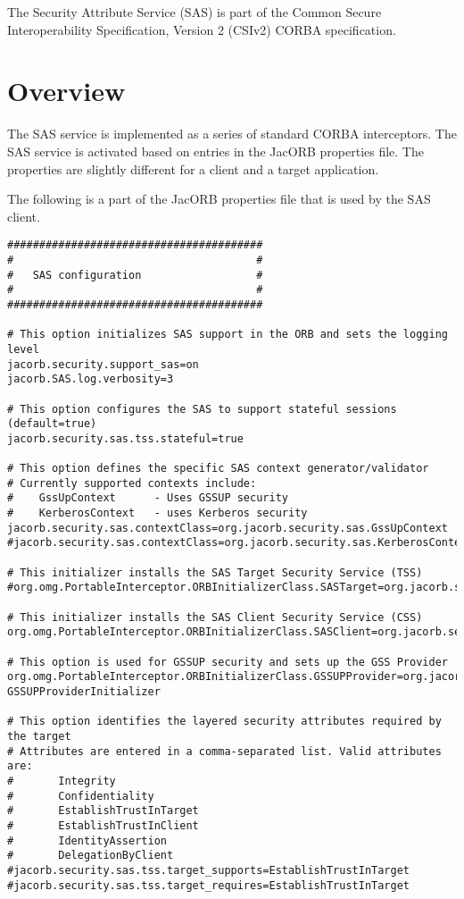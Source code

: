 
The Security Attribute Service (SAS) is part of the Common Secure 
Interoperability Specification, Version 2 (CSIv2) CORBA specification.

\section{Overview}

The SAS service is implemented as a series of standard CORBA interceptors.
The SAS service is activated based on entries in the JacORB properties file.
The properties are slightly different for a client and a target application.

The following is a part of the JacORB properties file that is used by 
the SAS client.

\begin{scriptsize}
\begin{verbatim}
########################################
#                                      #
#   SAS configuration                  #
#                                      #
########################################

# This option initializes SAS support in the ORB and sets the logging level
jacorb.security.support_sas=on
jacorb.SAS.log.verbosity=3

# This option configures the SAS to support stateful sessions (default=true)
jacorb.security.sas.tss.stateful=true

# This option defines the specific SAS context generator/validator
# Currently supported contexts include:
#    GssUpContext      - Uses GSSUP security
#    KerberosContext   - uses Kerberos security
jacorb.security.sas.contextClass=org.jacorb.security.sas.GssUpContext
#jacorb.security.sas.contextClass=org.jacorb.security.sas.KerberosContext

# This initializer installs the SAS Target Security Service (TSS)
#org.omg.PortableInterceptor.ORBInitializerClass.SASTarget=org.jacorb.security.sas.SASTargetInitializer

# This initializer installs the SAS Client Security Service (CSS)
org.omg.PortableInterceptor.ORBInitializerClass.SASClient=org.jacorb.security.sas.SASClientInitializer

# This option is used for GSSUP security and sets up the GSS Provider
org.omg.PortableInterceptor.ORBInitializerClass.GSSUPProvider=org.jacorb.security.sas.
GSSUPProviderInitializer

# This option identifies the layered security attributes required by the target
# Attributes are entered in a comma-separated list. Valid attributes are:
#       Integrity
#       Confidentiality
#       EstablishTrustInTarget
#       EstablishTrustInClient
#       IdentityAssertion
#       DelegationByClient
#jacorb.security.sas.tss.target_supports=EstablishTrustInTarget
#jacorb.security.sas.tss.target_requires=EstablishTrustInTarget
\end{verbatim}
\end{scriptsize}


